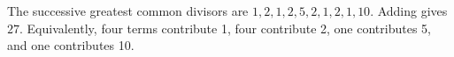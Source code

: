 The successive greatest common divisors are $1,2,1,2,5,2,1,2,1,10$. Adding gives $\boxed{27}$. Equivalently, four terms contribute 1, four contribute 2, one contributes 5, and one contributes 10.
